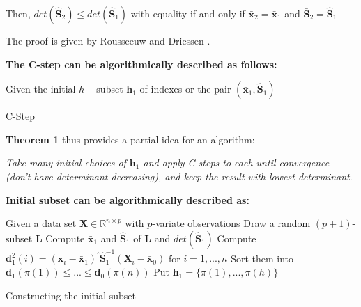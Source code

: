 \documentclass[review]{elsarticle}
\begin{document}
Then, $det(\boldsymbol{\hat{S}}_2) \leq det(\boldsymbol{\hat{S}}_1)$ with equality if and only if $\boldsymbol{\bar{x}}_2 = \boldsymbol{\bar{x}}_1$ and $\boldsymbol{\bar{S}}_2 = \boldsymbol{\hat{S}}_1$

The proof is given by Rousseeuw and Driessen \cite{rousseeuw1999fastmcd}.
	
\textbf{The C-step can be algorithmically described as follows:}
\begin{algorithm}
	\label{alg:alg01}
	\scriptsize
	\SetAlgoLined
	Given the initial $h-$subset $\boldsymbol{h}_1$ of indexes or the pair $(\boldsymbol{\bar{x}}_1, \boldsymbol{\hat{S}}_1)$\;
	\caption{C-Step}
\end{algorithm}

\textbf{Theorem 1} thus provides a partial idea for an algorithm: 

\textit{Take many initial choices of $\boldsymbol{h}_1$ and apply C-steps to each until convergence (don't have determinant decreasing), and keep the result with lowest determinant}.

\textbf{Initial subset can be algorithmically described as:}
\begin{algorithm}
	\label{alg:alg02}
	\scriptsize
	\SetAlgoLined
	Given a data set $\boldsymbol{X} \in \mathbb{R}^{n \times p}$ with $p$-variate observations\;
	Draw a random $(p + 1)$-subset $\boldsymbol{L}$\;
	Compute $\boldsymbol{\bar{x}}_1$ and $\boldsymbol{\hat{S}}_1$ of $\boldsymbol{L}$ and $det(\boldsymbol{\hat{S}}_1)$\;
	Compute $\boldsymbol{d}_1^2(i) = (\boldsymbol{x}_i - \boldsymbol{\bar{x}}_1)^\prime \boldsymbol{\hat{S}}_1^{-1}(\boldsymbol{X}_i - \boldsymbol{\bar{x}}_0)$ for $i = 1, ..., n$\;
	Sort them into $\boldsymbol{d}_1(\pi(1)) \leq ... \leq \boldsymbol{d}_0(\pi(n))$\;
	Put $\boldsymbol{h}_1 = \{\pi(1), ..., \pi(h)\}$\;
	\caption{Constructing the initial subset}
\end{algorithm}
\end{document}
